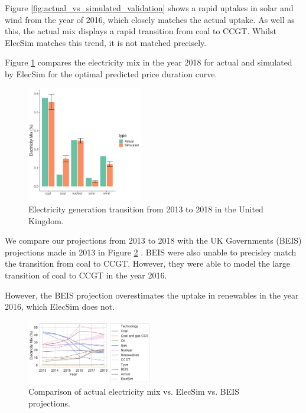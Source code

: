 \documentclass[final,3p,times,twocolumn,numbers]{elsarticle}
\begin{document}
Figure \ref{fig:actual_vs_simulated_validation} shows a rapid uptakes in solar and wind from the year of 2016, which closely matches the actual uptake. As well as this, the actual mix displays a rapid transition from coal to CCGT. Whilst ElecSim matches this trend, it is not matched precisely. 

Figure \ref{fig:uk_validated_results_2018} compares the electricity mix in the year 2018 for actual and simulated by ElecSim for the optimal predicted price duration curve. 

\begin{figure}
\centering
\includegraphics[width=0.45\textwidth]{figures/results/best_run.pdf}
\caption{Electricity generation transition from 2013 to 2018 in the United Kingdom.}
\label{fig:uk_validated_results_2018}
\end{figure}


We compare our projections from 2013 to 2018 with the UK Governments (BEIS) projections made in 2013 in Figure \ref{fig:beis_elecsim_historic_comparison} \cite{UKDECC2013}. BEIS were also unable to precisley match the transition from coal to CCGT. However, they were able to model the large transition of coal to CCGT in the year 2016.

However, the BEIS projection overestimates the uptake in renewables in the year 2016, which ElecSim does not.


\begin{figure}
\centering
\includegraphics[width=0.49\textwidth]{figures/results/throughout_years_beis_elecsim_comparison.pdf}
\caption{Comparison of actual electricity mix vs. ElecSim vs. BEIS projections.}
\label{fig:beis_elecsim_historic_comparison}
\end{figure}
\end{document}
